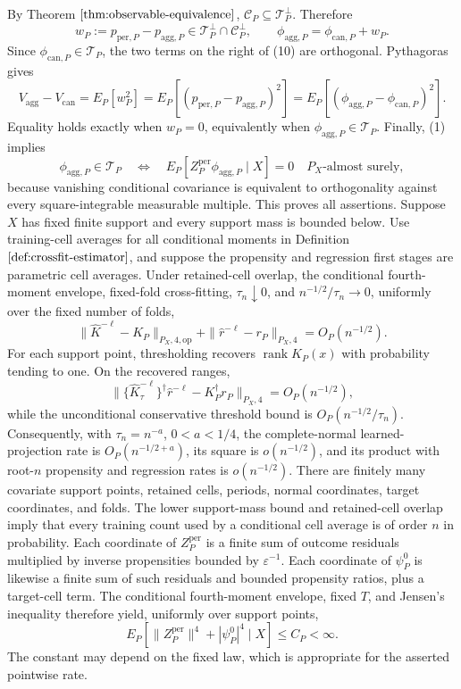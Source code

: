 By Theorem \(\ref{thm:observable-equivalence}\), \(\mathcal C_P\subseteq\mathcal T_P^\perp\).  Therefore
\[
w_P:=p_{\mathrm{per},P}-p_{\mathrm{agg},P}
\in\mathcal T_P^\perp\cap\mathcal C_P^\perp,
\qquad
\phi_{\mathrm{agg},P}=\phi_{\mathrm{can},P}+w_P.
\tag{10}
\]
Since \(\phi_{\mathrm{can},P}\in\mathcal T_P\), the two terms on the right of (10) are orthogonal.  Pythagoras gives
\[
V_{\mathrm{agg}}-V_{\mathrm{can}}=E_P[w_P^2]
=E_P[(p_{\mathrm{per},P}-p_{\mathrm{agg},P})^2]
=E_P[(\phi_{\mathrm{agg},P}-\phi_{\mathrm{can},P})^2].
\]
Equality holds exactly when \(w_P=0\), equivalently when \(\phi_{\mathrm{agg},P}\in\mathcal T_P\).  Finally, (1) implies
\[
\phi_{\mathrm{agg},P}\in\mathcal T_P
\quad\Longleftrightarrow\quad
E_P[Z_P^{\mathrm{per}}\phi_{\mathrm{agg},P}\mid X]=0
\quad P_X\text{-almost surely},
\]
because vanishing conditional covariance is equivalent to orthogonality against every square-integrable measurable multiple.  This proves all assertions.
Suppose \(X\) has fixed finite support and every support mass is bounded below.  Use training-cell averages for all conditional moments in Definition \(\ref{def:crossfit-estimator}\), and suppose the propensity and regression first stages are parametric cell averages.  Under retained-cell overlap, the conditional fourth-moment envelope, fixed-fold cross-fitting, \(\tau_n\downarrow0\), and \(n^{-1/2}/\tau_n\to0\), uniformly over the fixed number of folds,
\[
\|\widehat K^{-\ell}-K_P\|_{P_X,4,\mathrm{op}}
+\|\widehat r^{-\ell}-r_P\|_{P_X,4}=O_P(n^{-1/2}).
\]
For each support point, thresholding recovers \(\operatorname{rank}K_P(x)\) with probability tending to one.  On the recovered ranges,
\[
\|\{\widehat K^{-\ell}_\tau\}^{\dagger}\widehat r^{-\ell}
-K_P^\dagger r_P\|_{P_X,4}=O_P(n^{-1/2}),
\]
while the unconditional conservative threshold bound is \(O_P(n^{-1/2}/\tau_n)\).  Consequently, with \(\tau_n=n^{-a}\), \(0<a<1/4\), the complete-normal learned-projection rate is \(O_P(n^{-1/2+a})\), its square is \(o(n^{-1/2})\), and its product with root-\(n\) propensity and regression rates is \(o(n^{-1/2})\).
There are finitely many covariate support points, retained cells, periods, normal coordinates, target coordinates, and folds.  The lower support-mass bound and retained-cell overlap imply that every training count used by a conditional cell average is of order \(n\) in probability.  Each coordinate of \(Z_P^{\mathrm{per}}\) is a finite sum of outcome residuals multiplied by inverse propensities bounded by \(\varepsilon^{-1}\).  Each coordinate of \(\psi_P^0\) is likewise a finite sum of such residuals and bounded propensity ratios, plus a target-cell term.  The conditional fourth-moment envelope, fixed \(T\), and Jensen's inequality therefore yield, uniformly over support points,
\[
E_P[\|Z_P^{\mathrm{per}}\|^4+|\psi_P^0|^4\mid X]\le C_P<\infty.
\tag{11}
\]
The constant may depend on the fixed law, which is appropriate for the asserted pointwise rate.

